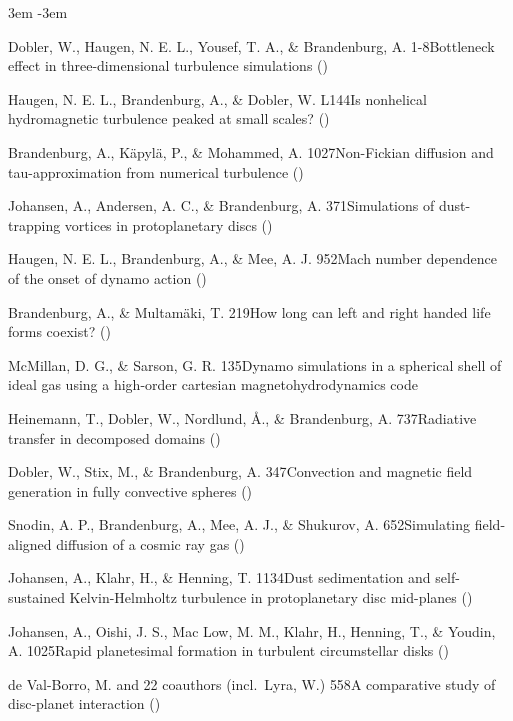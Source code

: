 \documentclass[\mydriver,12pt,twoside,notitlepage,a4paper]{article}
\begin{document}
\begin{list}{}{\leftmargin 3em \itemindent -3em\listparindent \itemindent
\itemsep 0pt \parsep 1pt}\item[]

Dobler, W., Haugen, N. E. L., Yousef, T. A., \&
Brandenburg, A.
{1-8}{Bottleneck effect in three-dimensional turbulence simulations}
()

Haugen, N. E. L., Brandenburg, A., \& Dobler, W.
{L144}{Is nonhelical hydromagnetic turbulence peaked at small scales?}
()

Brandenburg, A., K\"apyl\"a, P., \& Mohammed, A.
{1027}{Non-Fickian diffusion and tau-approximation from numerical turbulence}
()

Johansen, A., Andersen, A. C., \& Brandenburg, A.
{371}{Simulations of dust-trapping vortices in protoplanetary discs}
()

Haugen, N. E. L., Brandenburg, A., \& Mee, A. J.
{952}{Mach number dependence of the onset of dynamo action}
()

Brandenburg, A., \& Multam\"aki, T.
{219}{How long can left and right handed life forms coexist?}
()

McMillan, D. G., \& Sarson, G. R.
{135}{Dynamo simulations in a spherical shell of ideal gas using a 
high-order cartesian magnetohydrodynamics code}

Heinemann, T., Dobler, W., Nordlund, \AA., \&
Brandenburg, A.
{737}{Radiative transfer in decomposed domains}
()

Dobler, W., Stix, M., \& Brandenburg, A.
{347}{Convection and magnetic field generation in fully convective spheres}
()

Snodin, A. P., Brandenburg, A., Mee, A. J., \& Shukurov, A.
{652}{Simulating field-aligned diffusion of a cosmic ray gas}
()

Johansen, A., Klahr, H., \& Henning, T.
{1134}{Dust sedimentation and self-sustained Kelvin-Helmholtz turbulence
in protoplanetary disc mid-planes}
()

Johansen, A., Oishi, J. S., Mac Low, M. M., Klahr, H., Henning, T.,
\& Youdin, A.
{1025}{Rapid planetesimal formation in turbulent circumstellar disks}
()

de Val-Borro, M. and 22 coauthors (incl.\ Lyra, W.)
{558}{A comparative study of disc-planet interaction}
()

\end{list}
\end{document}
